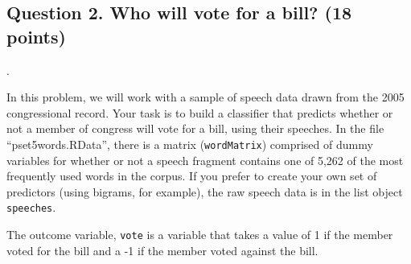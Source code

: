 \documentclass[11pt,english]{article}
\begin{document}
\subsection*{Question 2. Who will vote for a bill? (18 points)}.

In this problem, we will work with a sample of speech data drawn from the 2005 congressional record. Your task is to build a classifier that predicts whether or not a member of congress will vote for a bill, using their speeches. In the file ``pset5words.RData'', there is a matrix (\texttt{wordMatrix}) comprised of dummy variables for whether or not a speech fragment contains one of 5,262 of the most frequently used words in the corpus. If you prefer to create your own set of predictors (using bigrams, for example), the raw speech data is in the list object \texttt{speeches}.

The outcome variable, \texttt{vote} is a variable that takes a value of 1 if the member voted for the bill and a -1 if the member voted against the bill.
\end{document}
